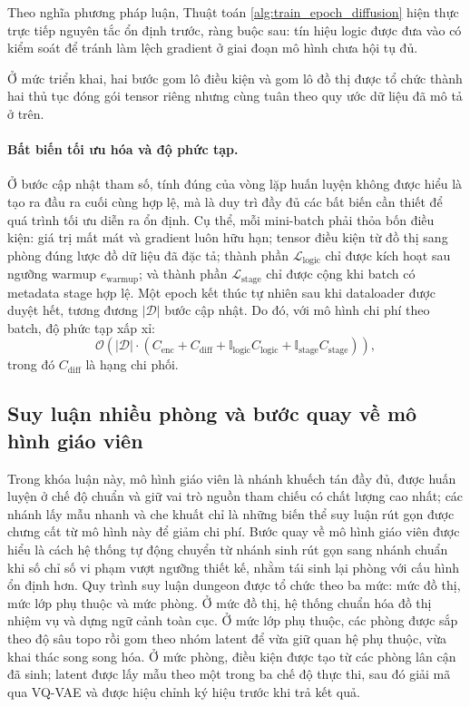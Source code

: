 \documentclass[oneside,a4paper,12pt]{extreport}
\begin{document}
Theo nghĩa phương pháp luận, Thuật toán \ref{alg:train_epoch_diffusion} hiện thực
trực tiếp nguyên tắc ổn định trước, ràng buộc sau: tín hiệu logic được đưa vào
có kiểm soát để tránh làm lệch gradient ở giai đoạn mô hình chưa hội tụ đủ.

Ở mức triển khai, hai bước gom lô điều kiện và gom lô đồ thị được tổ chức thành
hai thủ tục đóng gói tensor riêng nhưng cùng tuân theo quy ước dữ liệu đã mô
tả ở trên.

\paragraph{Bất biến tối ưu hóa và độ phức tạp.}
Ở bước cập nhật tham số, tính đúng của vòng lặp huấn luyện không được hiểu là
tạo ra đầu ra cuối cùng hợp lệ, mà là duy trì đầy đủ các bất biến cần thiết để
quá trình tối ưu diễn ra ổn định. Cụ thể, mỗi mini-batch phải thỏa bốn điều
kiện: giá trị mất mát và gradient luôn hữu hạn; tensor điều kiện từ đồ thị sang phòng
đúng lược đồ dữ liệu đã đặc tả; thành phần $\mathcal{L}_{\text{logic}}$ chỉ
được kích hoạt sau ngưỡng warmup $e_{\text{warmup}}$; và thành phần
$\mathcal{L}_{\text{stage}}$ chỉ được cộng khi batch có metadata stage hợp lệ.
Một epoch kết thúc tự nhiên sau khi dataloader được duyệt hết, tương đương
$|\mathcal{D}|$ bước cập nhật. Do đó, với mô hình chi phí theo batch, độ phức
tạp xấp xỉ:
\begin{equation}
\mathcal{O}\!\left(|\mathcal{D}|\cdot\left(C_{\text{enc}} + C_{\text{diff}} + \mathbb{I}_{\text{logic}}C_{\text{logic}} + \mathbb{I}_{\text{stage}}C_{\text{stage}}\right)\right),
\end{equation}
trong đó $C_{\text{diff}}$ là hạng chi phối.

\subsection{Suy luận nhiều phòng và bước quay về mô hình giáo viên}
Trong khóa luận này, mô hình giáo viên là nhánh khuếch tán đầy đủ, được huấn
luyện ở chế độ chuẩn và giữ vai trò nguồn tham chiếu có chất lượng cao nhất;
các nhánh lấy mẫu nhanh và che khuất chỉ là những biến thể suy luận rút gọn
được chưng cất từ mô hình này để giảm chi phí. Bước quay về mô hình giáo viên
được hiểu là cách hệ thống tự động chuyển từ nhánh sinh rút gọn sang nhánh
chuẩn khi số chỉ số vi phạm vượt ngưỡng thiết kế, nhằm tái sinh lại phòng với
cấu hình ổn định hơn. Quy trình suy luận dungeon được tổ chức theo ba mức: mức
đồ thị, mức lớp phụ thuộc và mức phòng. Ở mức đồ thị, hệ thống chuẩn hóa đồ thị
nhiệm vụ và dựng ngữ cảnh toàn cục. Ở mức lớp phụ thuộc, các phòng được sắp
theo độ sâu topo \cite{kahn1962topological} rồi gom theo nhóm latent để vừa giữ
quan hệ phụ thuộc, vừa khai thác song song hóa. Ở mức phòng, điều kiện được tạo
từ các phòng lân cận đã sinh; latent được lấy mẫu theo một trong ba chế độ thực
thi, sau đó giải mã qua VQ-VAE và được hiệu chỉnh ký hiệu trước khi trả kết quả.
\end{document}
